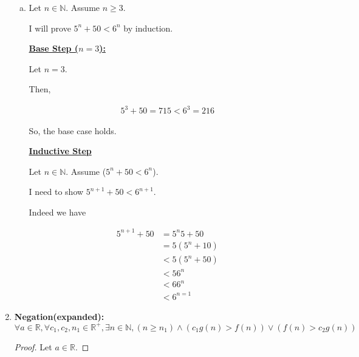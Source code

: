 \documentclass[12pt]{article}
\begin{document}
\begin{enumerate}[1.]
\begin{enumerate}[a)]
        \item Let $n \in \mathbb{N}$. Assume $n \geq 3$.
        \setcounter{equation}{0}
        \bigskip

        I will prove $5^n + 50 < 6^n$ by induction.

        \bigskip

        \underline{\textbf{Base Step ($n = 3$):}}

        \bigskip

        Let $n = 3$.

        \bigskip

        Then,

        \begin{align}
            5^3 + 50 = 715 < 6^3 = 216
        \end{align}

        \bigskip

        So, the base case holds.

        \bigskip

        \underline{\textbf{Inductive Step}}

        \bigskip

        Let $n \in \mathbb{N}$. Assume ($5^n + 50 < 6^n$).

        \bigskip

        I need to show $5^{n+1} + 50 < 6^{n+1}$.

        \bigskip

        Indeed we have

        \begin{align}
            5^{n+1} + 50 &= 5^n5 + 50\\
            &= 5(5^n + 10)\\
            &< 5(5^n + 50)\\
            &< 56^n\\
            &< 66^n\\
            &< 6^{n=1}
        \end{align}
    \end{enumerate}

    \item
    \setcounter{equation}{0}
    \textbf{Negation(expanded):} $\forall a \in \mathbb{R}, \forall c_1, c_2, n_1 \in \mathbb{R}^+, \exists n \in \mathbb{N},
    (n \geq n_1) \land (c_1 g(n) > f(n)) \lor (f(n) > c_2g(n))$

    \bigskip
    \begin{proof}
        Let $a \in \mathbb{R}$.


\end{proof}
\end{enumerate}
\end{document}
